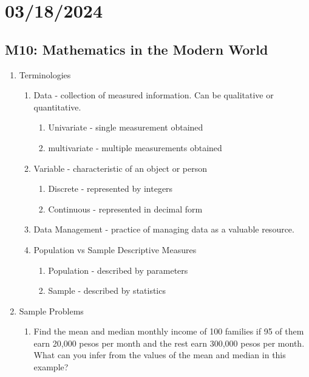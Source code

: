 \documentclass{article}
\begin{document}
\section*{03/18/2024}
\subsection*{M10: Mathematics in the Modern World}
\begin{enumerate}
    \item Terminologies
        \begin{enumerate}
            \item Data
             - collection of measured information. Can be qualitative or quantitative.
                \begin{enumerate}
                    \item Univariate - single measurement obtained
                    \item multivariate - multiple measurements obtained
                \end{enumerate}
            \item Variable - characteristic of an object or person
                \begin{enumerate}
                    \item Discrete - represented by integers
                    \item Continuous - represented in decimal form
                \end{enumerate}
            \item Data Management - practice of managing data as a valuable resource.
            \item Population vs Sample Descriptive Measures
                \begin{enumerate}
                    \item Population - described by parameters
                    \item Sample - described by statistics
                \end{enumerate}
        \end{enumerate}
    \item Sample Problems
        \begin{enumerate}
            \item Find the mean and median monthly income of 100 families if 95 of them earn 20,000 pesos per month and the rest earn 300,000 pesos per month. What can you infer from the values of the mean and median in this example?                    

\end{enumerate}
\end{enumerate}
\end{document}
